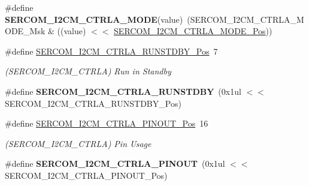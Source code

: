 \begin{DoxyCompactItemize}
\item 
\hypertarget{group___s_a_m_l21___s_e_r_c_o_m_ga9a8a678cce4d48aad639f86565fd7cf7}{}\#define {\bfseries S\+E\+R\+C\+O\+M\+\_\+\+I2\+C\+M\+\_\+\+C\+T\+R\+L\+A\+\_\+\+M\+O\+D\+E}(value)~(S\+E\+R\+C\+O\+M\+\_\+\+I2\+C\+M\+\_\+\+C\+T\+R\+L\+A\+\_\+\+M\+O\+D\+E\+\_\+\+Msk \& ((value) $<$$<$ \hyperlink{group___s_a_m_l21___s_e_r_c_o_m_gaa8f5b3c26e3c756262d48982291c7cce}{S\+E\+R\+C\+O\+M\+\_\+\+I2\+C\+M\+\_\+\+C\+T\+R\+L\+A\+\_\+\+M\+O\+D\+E\+\_\+\+Pos}))\label{group___s_a_m_l21___s_e_r_c_o_m_ga9a8a678cce4d48aad639f86565fd7cf7}

\item 
\hypertarget{group___s_a_m_l21___s_e_r_c_o_m_gaf61b393a7890312b581e83234b2680ad}{}\#define \hyperlink{group___s_a_m_l21___s_e_r_c_o_m_gaf61b393a7890312b581e83234b2680ad}{S\+E\+R\+C\+O\+M\+\_\+\+I2\+C\+M\+\_\+\+C\+T\+R\+L\+A\+\_\+\+R\+U\+N\+S\+T\+D\+B\+Y\+\_\+\+Pos}~7\label{group___s_a_m_l21___s_e_r_c_o_m_gaf61b393a7890312b581e83234b2680ad}

\begin{DoxyCompactList}\small\item\em (S\+E\+R\+C\+O\+M\+\_\+\+I2\+C\+M\+\_\+\+C\+T\+R\+L\+A) Run in Standby \end{DoxyCompactList}\item 
\hypertarget{group___s_a_m_l21___s_e_r_c_o_m_ga5445f6b1ee05eba220173498050116c1}{}\#define {\bfseries S\+E\+R\+C\+O\+M\+\_\+\+I2\+C\+M\+\_\+\+C\+T\+R\+L\+A\+\_\+\+R\+U\+N\+S\+T\+D\+B\+Y}~(0x1ul $<$$<$ S\+E\+R\+C\+O\+M\+\_\+\+I2\+C\+M\+\_\+\+C\+T\+R\+L\+A\+\_\+\+R\+U\+N\+S\+T\+D\+B\+Y\+\_\+\+Pos)\label{group___s_a_m_l21___s_e_r_c_o_m_ga5445f6b1ee05eba220173498050116c1}

\item 
\hypertarget{group___s_a_m_l21___s_e_r_c_o_m_ga45259b63428364ebe44ff6fdf9dd04af}{}\#define \hyperlink{group___s_a_m_l21___s_e_r_c_o_m_ga45259b63428364ebe44ff6fdf9dd04af}{S\+E\+R\+C\+O\+M\+\_\+\+I2\+C\+M\+\_\+\+C\+T\+R\+L\+A\+\_\+\+P\+I\+N\+O\+U\+T\+\_\+\+Pos}~16\label{group___s_a_m_l21___s_e_r_c_o_m_ga45259b63428364ebe44ff6fdf9dd04af}

\begin{DoxyCompactList}\small\item\em (S\+E\+R\+C\+O\+M\+\_\+\+I2\+C\+M\+\_\+\+C\+T\+R\+L\+A) Pin Usage \end{DoxyCompactList}\item 
\hypertarget{group___s_a_m_l21___s_e_r_c_o_m_ga836b88bc8196e61faecf54ee9d222c95}{}\#define {\bfseries S\+E\+R\+C\+O\+M\+\_\+\+I2\+C\+M\+\_\+\+C\+T\+R\+L\+A\+\_\+\+P\+I\+N\+O\+U\+T}~(0x1ul $<$$<$ S\+E\+R\+C\+O\+M\+\_\+\+I2\+C\+M\+\_\+\+C\+T\+R\+L\+A\+\_\+\+P\+I\+N\+O\+U\+T\+\_\+\+Pos)\label{group___s_a_m_l21___s_e_r_c_o_m_ga836b88bc8196e61faecf54ee9d222c95}


\end{DoxyCompactItemize}
